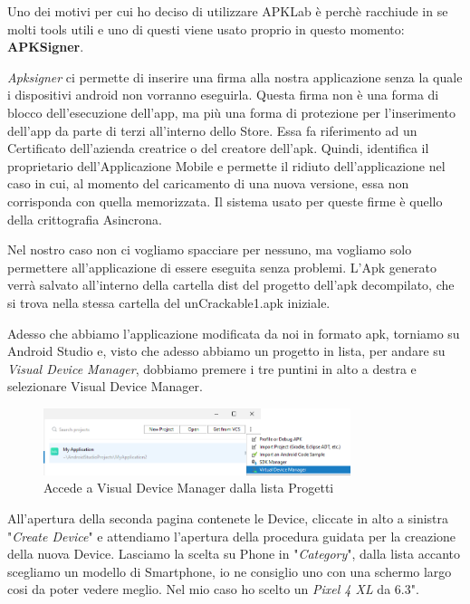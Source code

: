\documentclass{article}
\begin{document}
Uno dei motivi per cui ho deciso di utilizzare APKLab è perchè racchiude in se molti tools utili e uno di questi viene usato proprio in questo momento: \textbf{APKSigner}.

\textit{Apksigner} ci permette di inserire una firma alla nostra applicazione senza la quale i dispositivi android non vorranno eseguirla. Questa firma non è una forma di blocco 
dell'esecuzione dell'app, ma più una forma di protezione per l'inserimento dell'app da parte di terzi all'interno dello Store. 
Essa fa riferimento ad un Certificato dell'azienda creatrice o del creatore dell'apk. 
Quindi, identifica il proprietario dell'Applicazione Mobile e permette il ridiuto dell'applicazione nel caso in cui, al momento del caricamento di 
una nuova versione, essa non corrisponda con quella memorizzata. Il sistema usato per queste firme è quello della crittografia Asincrona. 

Nel nostro caso non ci vogliamo spacciare per nessuno, ma vogliamo solo permettere all'applicazione di essere eseguita senza problemi. L'Apk generato 
verrà salvato all'interno della cartella dist del progetto dell'apk decompilato, che si trova nella stessa cartella del unCrackable1.apk iniziale.

Adesso che abbiamo l'applicazione modificata da noi in formato apk, torniamo su Android Studio e, visto che adesso abbiamo un progetto in lista, per 
andare su \textit{Visual Device Manager}, dobbiamo premere i tre puntini in alto a destra e selezionare Visual Device Manager.
\begin{figure}[htbp]
    \centering
    \includegraphics[width=0.8\textwidth]{./uncrackable1/NewDev.png}
    \captionsetup{labelformat=empty}
    \caption{Accede a Visual Device Manager dalla lista Progetti}
    \label{fig:vdmNew}
\end{figure}

All'apertura della seconda pagina contenete le Device, cliccate in alto a sinistra "\textit{Create Device}" e attendiamo l'apertura della procedura 
guidata per la creazione della nuova Device. Lasciamo la scelta su Phone in "\textit{Category}", dalla lista accanto scegliamo un modello di Smartphone,
 io ne consiglio uno con una schermo largo cosi da poter vedere meglio. Nel mio caso ho scelto un \textit{Pixel 4 XL} da 6.3".
\end{document}
